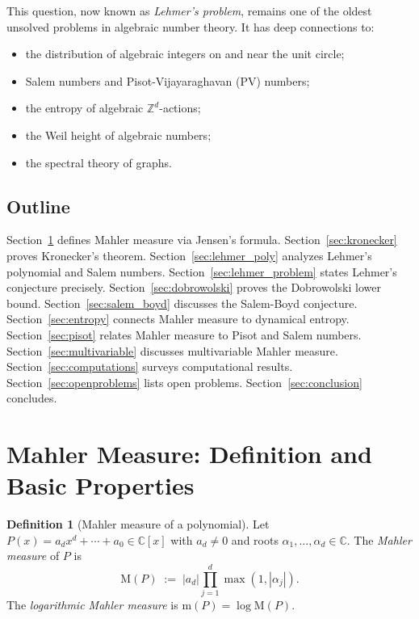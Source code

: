 \documentclass[12pt,a4paper]{amsart}
\theoremstyle{definition}
\newtheorem{definition}[theorem]{Definition}
\theoremstyle{remark}
\newcommand{\Z}{\mathbb{Z}}
\newcommand{\C}{\mathbb{C}}
\newcommand{\M}{\mathrm{M}}
\newcommand{\m}{\mathrm{m}}
\begin{document}
This question, now known as \emph{Lehmer's problem}, remains one of the oldest unsolved
problems in algebraic number theory. It has deep connections to:
\begin{itemize}
  \item the distribution of algebraic integers on and near the unit circle;
  \item Salem numbers and Pisot-Vijayaraghavan (PV) numbers;
  \item the entropy of algebraic $\Z^d$-actions;
  \item the Weil height of algebraic numbers;
  \item the spectral theory of graphs.
\end{itemize}

\subsection{Outline}
Section~\ref{sec:mahler_def} defines Mahler measure via Jensen's formula.
Section~\ref{sec:kronecker} proves Kronecker's theorem.
Section~\ref{sec:lehmer_poly} analyzes Lehmer's polynomial and Salem numbers.
Section~\ref{sec:lehmer_problem} states Lehmer's conjecture precisely.
Section~\ref{sec:dobrowolski} proves the Dobrowolski lower bound.
Section~\ref{sec:salem_boyd} discusses the Salem-Boyd conjecture.
Section~\ref{sec:entropy} connects Mahler measure to dynamical entropy.
Section~\ref{sec:pisot} relates Mahler measure to Pisot and Salem numbers.
Section~\ref{sec:multivariable} discusses multivariable Mahler measure.
Section~\ref{sec:computations} surveys computational results.
Section~\ref{sec:openproblems} lists open problems.
Section~\ref{sec:conclusion} concludes.

\section{Mahler Measure: Definition and Basic Properties}\label{sec:mahler_def}

\begin{definition}[Mahler measure of a polynomial]
  Let $P(x) = a_d x^d + \cdots + a_0 \in \C[x]$ with $a_d \neq 0$ and roots
  $\alpha_1,\ldots,\alpha_d \in \C$. The \emph{Mahler measure} of $P$ is
  \[
    \M(P) \;:=\; |a_d| \prod_{j=1}^d \max(1, |\alpha_j|).
  \]
  The \emph{logarithmic Mahler measure} is $\m(P) = \log \M(P)$.
\end{definition}
\end{document}
